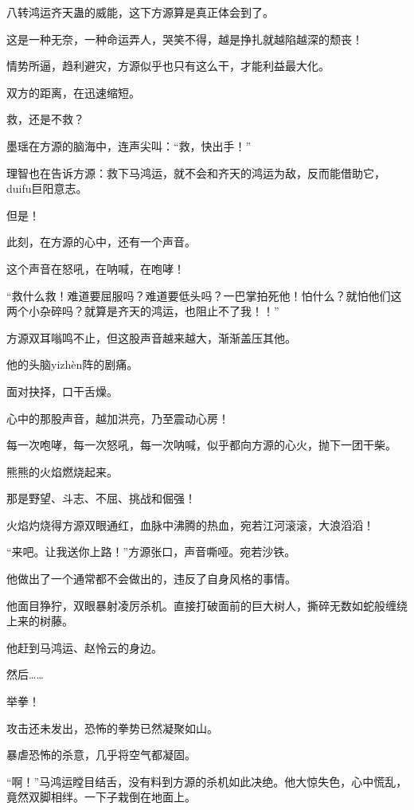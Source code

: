 
\begin{this_body}

八转鸿运齐天蛊的威能，这下方源算是真正体会到了。

这是一种无奈，一种命运弄人，哭笑不得，越是挣扎就越陷越深的颓丧！

情势所逼，趋利避灾，方源似乎也只有这么干，才能利益最大化。

双方的距离，在迅速缩短。

救，还是不救？

墨瑶在方源的脑海中，连声尖叫：“救，快出手！”

理智也在告诉方源：救下马鸿运，就不会和齐天的鸿运为敌，反而能借助它，duifu巨阳意志。

但是！

此刻，在方源的心中，还有一个声音。

这个声音在怒吼，在呐喊，在咆哮！

“救什么救！难道要屈服吗？难道要低头吗？一巴掌拍死他！怕什么？就怕他们这两个小杂碎吗？就算是齐天的鸿运，也阻止不了我！！”

方源双耳嗡鸣不止，但这股声音越来越大，渐渐盖压其他。

他的头脑yizhèn阵的剧痛。

面对抉择，口干舌燥。

心中的那股声音，越加洪亮，乃至震动心房！

每一次咆哮，每一次怒吼，每一次呐喊，似乎都向方源的心火，抛下一团干柴。

熊熊的火焰燃烧起来。

那是野望、斗志、不屈、挑战和倔强！

火焰灼烧得方源双眼通红，血脉中沸腾的热血，宛若江河滚滚，大浪滔滔！

“来吧。让我送你上路！”方源张口，声音嘶哑。宛若沙铁。

他做出了一个通常都不会做出的，违反了自身风格的事情。

他面目狰狞，双眼暴射凌厉杀机。直接打破面前的巨大树人，撕碎无数如蛇般缠绕上来的树藤。

他赶到马鸿运、赵怜云的身边。

然后……

举拳！

攻击还未发出，恐怖的拳势已然凝聚如山。

暴虐恐怖的杀意，几乎将空气都凝固。

“啊！”马鸿运瞠目结舌，没有料到方源的杀机如此决绝。他大惊失色，心中慌乱，竟然双脚相绊。一下子栽倒在地面上。


\end{this_body}
